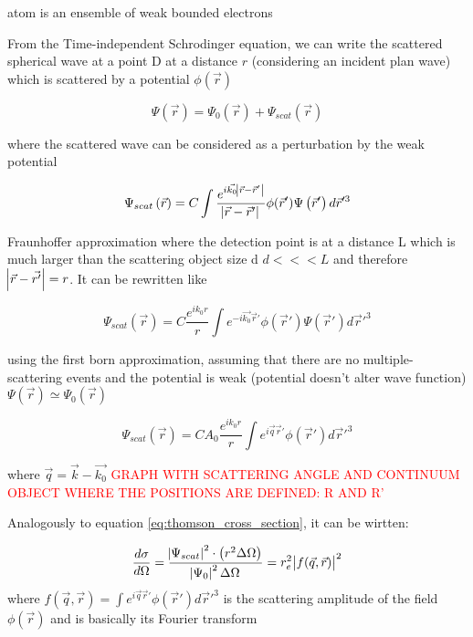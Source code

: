 atom is an ensemble of weak bounded electrons

From the Time-independent Schrodinger equation, we can write the scattered spherical wave at a point D at a distance $r$ (considering an incident plan wave) which is scattered by a potential $\phi(\vec{r})$

\begin{equation}
       \Psi\left( \vec{r} \right)= \Psi_0\left( \vec{r} \right) +  \Psi_{scat}\left( \vec{r} \right)
\end{equation}

where the scattered wave can be considered as a perturbation by the weak potential

\begin{equation}
       \Psi_{scat}\left( \vec{r} \right)=C \int \frac{e^{ i \vec{k_0}\abs{\vec{r}-\vec{r}'} } } {\abs{\vec{r}-\vec{r}'}} \phi(\vec{r}')   \Psi\left( \vec{r}' \right) d\vec{r}'^3
\end{equation}

Fraunhoffer approximation where the detection point is at a distance L which is much larger than the scattering object size d $d<<<L$ and therefore $\abs{\vec{r}-\vec{r'}}=r$. It can be rewritten like

\begin{equation}
       \Psi_{scat}\left( \vec{r} \right)=C \frac{e^{i k_0 r}}{r} \int e^{ -i \vec{k_0}\vec{r}' }  \phi(\vec{r}')   \Psi\left( \vec{r}' \right) d\vec{r}'^3
\end{equation}

using the first born approximation, assuming that there are no multiple-scattering events and the potential is weak (potential doesn't alter wave function)  $ \Psi\left( \vec{r} \right) \simeq \Psi_0\left( \vec{r} \right)$

\begin{equation}
       \Psi_{scat}\left( \vec{r} \right)=C A_0 \frac{e^{i k_0 r}}{r} \int e^{ i \vec{q}\vec{r}' }  \phi(\vec{r}')  d\vec{r}'^3
\end{equation}

where $\vec{q}=\vec{k} - \vec{k_0}$ \textcolor{red}{GRAPH WITH SCATTERING ANGLE AND CONTINUUM OBJECT WHERE THE POSITIONS ARE DEFINED: R AND R'}

Analogously to equation \ref{eq:thomson_cross_section}, it can be wirtten:

\begin{equation}
        \label{eq:rayleigh_cross_section}
        \frac{d\sigma}{d\Omega}= \frac{\abs{\Psi_{scat}}^2 \cdot \left(r^2 \Delta \Omega \right)}{\abs{\Psi_{0}}^2\Delta \Omega}=r_e^2 \abs{f(\vec{q},\vec{r})}^2
\end{equation}
where $f(\vec{q},\vec{r})=\int e^{ i \vec{q}\vec{r}' }  \phi(\vec{r}')  d\vec{r}'^3$ is the scattering amplitude of the field $\phi(\vec{r})$ and is basically its Fourier transform

